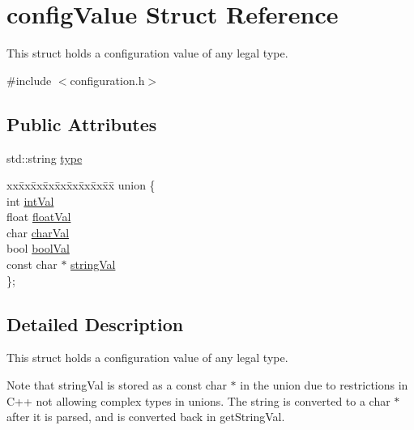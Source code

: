 \hypertarget{structconfigValue}{\section{config\-Value Struct Reference}
\label{structconfigValue}
}


This struct holds a configuration value of any legal type.  




{\ttfamily \#include $<$configuration.\-h$>$}

\subsection*{Public Attributes}
\begin{DoxyCompactItemize}
\item 
std\-::string \hyperlink{structconfigValue_a2557316e4aad2ae77db15e19422e8aae}{type}
\item 
\begin{tabbing}
xx\=xx\=xx\=xx\=xx\=xx\=xx\=xx\=xx\=\kill
union \{\\
\>int \hyperlink{structconfigValue_a85f3ab82fc453795a31914bec4bfa877}{intVal}\\
\>float \hyperlink{structconfigValue_a5ee65a7274dd76adc86467789da27075}{floatVal}\\
\>char \hyperlink{structconfigValue_a21dd817d08a5648100732180b81f714e}{charVal}\\
\>bool \hyperlink{structconfigValue_a559a52e0234967d6fb4c0e58030de255}{boolVal}\\
\>const char $\ast$ \hyperlink{structconfigValue_ab7bde03d2ca73f84b5da8fd21b479790}{stringVal}\\
\}; \\

\end{tabbing}\end{DoxyCompactItemize}


\subsection{Detailed Description}
This struct holds a configuration value of any legal type. 

Note that string\-Val is stored as a const char $\ast$ in the union due to restrictions in C++ not allowing complex types in unions. The string is converted to a char $\ast$ after it is parsed, and is converted back in get\-String\-Val. 

